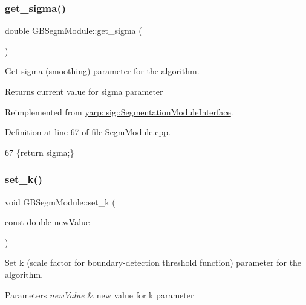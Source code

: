 \subsubsection{\texorpdfstring{get\+\_\+sigma()}{get\_sigma()}}
{\footnotesize\ttfamily double G\+B\+Segm\+Module\+::get\+\_\+sigma (\begin{DoxyParamCaption}{ }\end{DoxyParamCaption})\hspace{0.3cm}{\ttfamily [virtual]}}



Get sigma (smoothing) parameter for the algorithm. 

\begin{DoxyReturn}{Returns}
current value for sigma parameter 
\end{DoxyReturn}


Reimplemented from \hyperlink{classyarp_1_1sig_1_1SegmentationModuleInterface_a38431f2c63d7da8ebf20adf0ed1da4fe}{yarp\+::sig\+::\+Segmentation\+Module\+Interface}.



Definition at line 67 of file Segm\+Module.\+cpp.


\begin{DoxyCode}
67 \{\textcolor{keywordflow}{return} sigma;\}
\end{DoxyCode}
\mbox{\label{classGBSegmModule_a15129913273e221a46c428f697e40575}} 
\subsubsection{\texorpdfstring{set\+\_\+k()}{set\_k()}}
{\footnotesize\ttfamily void G\+B\+Segm\+Module\+::set\+\_\+k (\begin{DoxyParamCaption}\item[{const double}]{new\+Value }\end{DoxyParamCaption})\hspace{0.3cm}{\ttfamily [virtual]}}



Set k (scale factor for boundary-\/detection threshold function) parameter for the algorithm. 


\begin{DoxyParams}{Parameters}
{\em new\+Value} & new value for k parameter \\
\hline
\end{DoxyParams}


